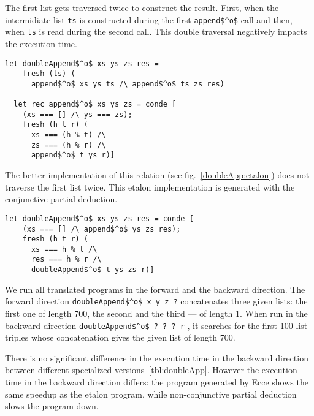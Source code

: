 The first list gets traversed twice to construct the result.
First, when the intermidiate list \lstinline{ts} is constructed during the first \lstinline{append$^o$} call and then, when \lstinline{ts} is read during the second call.
This double traversal negatively impacts the execution time.

\begin{figure*}[!h]
  \centering
  \begin{minipage}{0.8\textwidth}
    \begin{lstlisting}[label={doubleApp}, caption={Concatenation of three lists}, captionpos=b, frame=tb]
  let doubleAppend$^o$ xs ys zs res =
    fresh (ts) (
      append$^o$ xs ys ts /\ append$^o$ ts zs res)

  let rec append$^o$ xs ys zs = conde [
    (xs === [] /\ ys === zs);
    fresh (h t r) (
      xs === (h % t) /\
      zs === (h % r) /\
      append$^o$ t ys r)]
    \end{lstlisting}
  \end{minipage}
\end{figure*}

The better implementation of this relation (see fig.~\ref{doubleApp:etalon}) does not traverse the first list twice.
This etalon implementation is generated with the conjunctive partial deduction.

\begin{figure*}[!h]
  \centering
  \begin{minipage}{0.8\textwidth}
    \begin{lstlisting}[label={doubleApp:etalon}, caption={Etalon implementation of concatenation of three lists}, captionpos=b, frame=tb]
  let doubleAppend$^o$ xs ys zs res = conde [
    (xs === [] /\ append$^o$ ys zs res);
    fresh (h t r) (
      xs === h % t /\
      res === h % r /\
      doubleAppend$^o$ t ys zs r)]
    \end{lstlisting}
  \end{minipage}
\end{figure*}

We run all translated programs in the forward and the backward direction.
The forward direction \lstinline{doubleAppend$^o$ x y z ?} concatenates three given lists: the first one of length 700, the second and the third --- of length 1.
When run in the backward direction \lstinline{doubleAppend$^o$ ? ? ? r} , it searches for the first 100 list triples whose concatenation gives the given list of length 700.

There is no significant difference in the execution time in the backward direction between different specialized versions~\ref{tbl:doubleApp}.
However the execution time in the backward direction differs: the program generated by Ecce shows the same speedup as the etalon program, while non-conjunctive partial deduction slows the program down.

